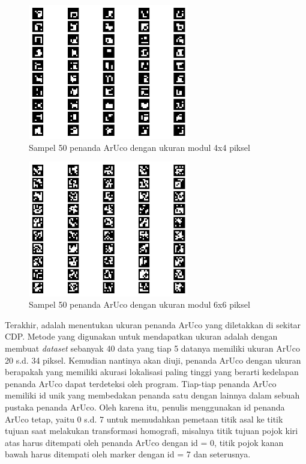 \begin{figure}[!ht]
	\centering
	\includegraphics[width=7cm]{contents/chapter-3/3-aruco4x4.png}
	\caption{Sampel 50 penanda ArUco dengan ukuran modul 4x4 piksel}
	\label{Fig: 3-aruco4x4}
\end{figure}

\begin{figure}[!ht]
	\centering
	\includegraphics[width=7cm]{contents/chapter-3/3-aruco6x6.png}
	\caption{Sampel 50 penanda ArUco dengan ukuran modul 6x6 piksel}
	\label{Fig: 3-aruco6x6}
\end{figure}

Terakhir, adalah menentukan ukuran penanda ArUco yang diletakkan di sekitar CDP. Metode yang digunakan untuk mendapatkan ukuran adalah dengan membuat
\emph{dataset} sebanyak 40 data yang tiap 5 datanya memiliki ukuran ArUco 20 s.d. 34 piksel. Kemudian nantinya akan diuji, penanda ArUco dengan ukuran
berapakah yang memiliki akurasi lokalisasi paling tinggi yang berarti kedelapan penanda ArUco dapat terdeteksi oleh program. Tiap-tiap penanda ArUco memiliki
id unik yang membedakan penanda satu dengan lainnya dalam sebuah pustaka penanda ArUco. Oleh karena itu, penulis menggunakan id penanda ArUco tetap, yaitu 0
s.d. 7 untuk memudahkan pemetaan titik asal ke titik tujuan saat melakukan transformasi homografi, misalnya titik tujuan pojok kiri atas harus ditempati oleh
penanda ArUco dengan id = 0, titik pojok kanan bawah harus ditempati oleh marker dengan id = 7 dan seterusnya.

